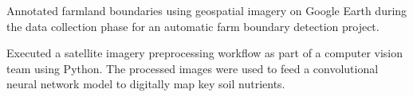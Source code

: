 \documentclass[letterpaper]{deedy-resume} %
\begin{document}
\begin{minipage}[t]{0.66\textwidth}






\begin{tightitemize}
\item Annotated farmland boundaries using geospatial imagery on Google Earth during the data collection phase for an automatic farm boundary detection project.
\item Executed a satellite imagery preprocessing workflow as part of a computer vision team using Python. The processed images were used to feed a convolutional neural network model to digitally map key soil nutrients.
\end{tightitemize}
\sectionspace %


\end{minipage}
\end{document}
